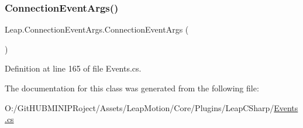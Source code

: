 \subsubsection{\texorpdfstring{ConnectionEventArgs()}{ConnectionEventArgs()}}
{\footnotesize\ttfamily Leap.\+Connection\+Event\+Args.\+Connection\+Event\+Args (\begin{DoxyParamCaption}{ }\end{DoxyParamCaption})}



Definition at line 165 of file Events.\+cs.



The documentation for this class was generated from the following file\+:\begin{DoxyCompactItemize}
\item 
O\+:/\+Git\+H\+U\+B\+M\+I\+N\+I\+P\+Roject/\+Assets/\+Leap\+Motion/\+Core/\+Plugins/\+Leap\+C\+Sharp/\mbox{\hyperlink{_events_8cs}{Events.\+cs}}\end{DoxyCompactItemize}
